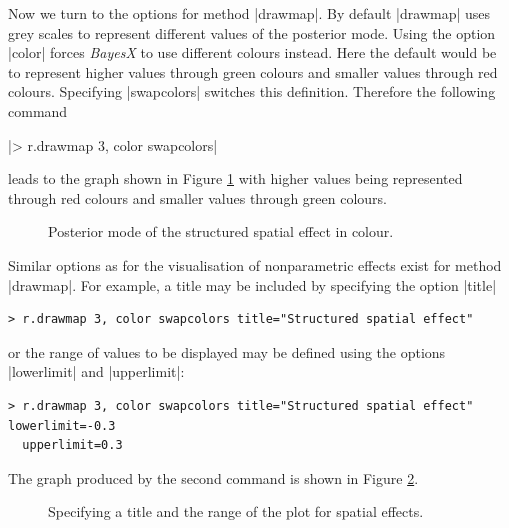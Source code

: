 \documentclass[a4paper]{article}
\begin{document}
Now we turn to the options for method |drawmap|. By default
|drawmap| uses grey scales to represent different values of the
posterior mode. Using the option |color| forces {\it BayesX} to
use different colours instead. Here the default would be to
represent higher values through green colours and smaller values
through red colours. Specifying |swapcolors| switches this
definition. Therefore the following command

|> r.drawmap 3, color swapcolors|

leads to the graph shown in Figure \ref{spat3} with higher values
being represented through red colours and smaller values through
green colours.

\begin{figure}[ht]
\begin{center}
{\it\caption{Posterior mode of the structured spatial effect in
colour.\label{spat3}}}
\end{center}
\end{figure}


Similar options as for the visualisation of nonparametric effects
exist for method |drawmap|. For example, a title may be included
by specifying the option |title|

\begin{verbatim}
> r.drawmap 3, color swapcolors title="Structured spatial effect"
\end{verbatim}

or the range of values to be displayed may be defined using the
options |lowerlimit| and |upperlimit|:

\begin{verbatim}
> r.drawmap 3, color swapcolors title="Structured spatial effect" lowerlimit=-0.3
  upperlimit=0.3
\end{verbatim}

The graph produced by the second command is shown in Figure
\ref{spat4}.

\begin{figure}[ht]
\begin{center}
{\it\caption{Specifying a title and the range of the plot for
spatial effects.\label{spat4}}}
\end{center}
\end{figure}

\end{document}
